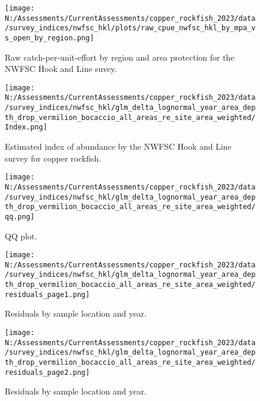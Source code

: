 \documentclass[11pt,
  english,
  letterpaper,
]{article}
\begin{document}
\newpage



\newpage

\begin{figure}
\centering
\texttt{[image: N:/Assessments/CurrentAssessments/copper\_rockfish\_2023/data/survey\_indices/nwfsc\_hkl/plots/raw\_cpue\_nwfsc\_hkl\_by\_mpa\_vs\_open\_by\_region.png]}
\caption{Raw catch-per-unit-effort by region and area protection for the NWFSC Hook and Line suvey.\label{fig:nwfsc-hkl-index-raw}}
\end{figure}

\newpage

\begin{figure}
\centering
\texttt{[image: N:/Assessments/CurrentAssessments/copper\_rockfish\_2023/data/survey\_indices/nwfsc\_hkl/glm\_delta\_lognormal\_year\_area\_depth\_drop\_vermilion\_bocaccio\_all\_areas\_re\_site\_area\_weighted/Index.png]}
\caption{Estimated index of abundance by the NWFSC Hook and Line survey for copper rockfish.\label{fig:nwfsc-hkl-index}}
\end{figure}

\newpage

\begin{figure}
\centering
\texttt{[image: N:/Assessments/CurrentAssessments/copper\_rockfish\_2023/data/survey\_indices/nwfsc\_hkl/glm\_delta\_lognormal\_year\_area\_depth\_drop\_vermilion\_bocaccio\_all\_areas\_re\_site\_area\_weighted/qq.png]}
\caption{QQ plot.\label{fig:nwfsc-hkl-qq}}
\end{figure}

\newpage

\begin{figure}
\centering
\texttt{[image: N:/Assessments/CurrentAssessments/copper\_rockfish\_2023/data/survey\_indices/nwfsc\_hkl/glm\_delta\_lognormal\_year\_area\_depth\_drop\_vermilion\_bocaccio\_all\_areas\_re\_site\_area\_weighted/residuals\_page1.png]}
\caption{Residuals by sample location and year.\label{fig:nwfsc-hkl-resid-1}}
\end{figure}

\newpage

\begin{figure}
\centering
\texttt{[image: N:/Assessments/CurrentAssessments/copper\_rockfish\_2023/data/survey\_indices/nwfsc\_hkl/glm\_delta\_lognormal\_year\_area\_depth\_drop\_vermilion\_bocaccio\_all\_areas\_re\_site\_area\_weighted/residuals\_page2.png]}
\caption{Residuals by sample location and year.\label{fig:nwfsc-hkl-resid-2}}
\end{figure}
\end{document}
